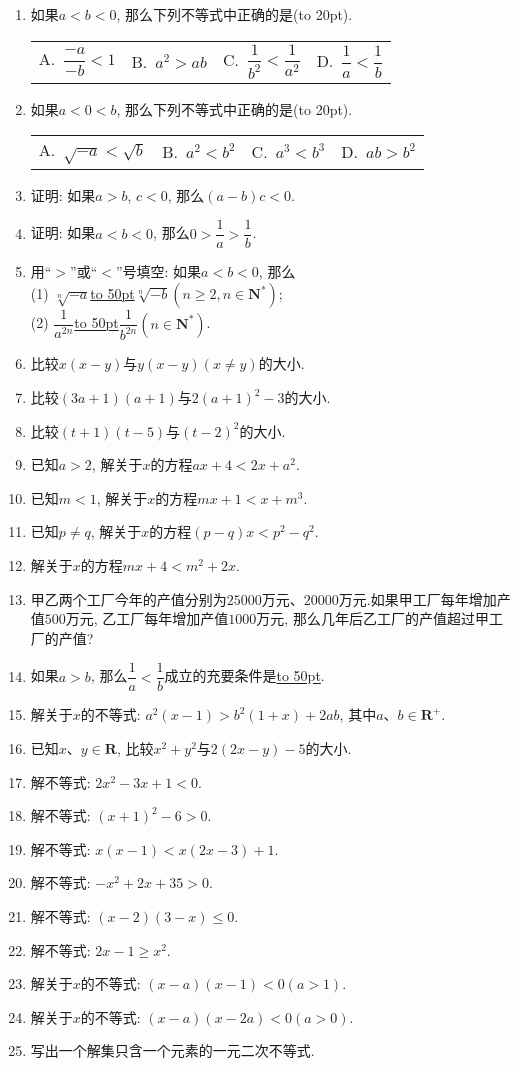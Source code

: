 \documentclass[10pt,a4paper]{article}
\newcommand{\blank}[1]{\underline{\hbox to #1pt{}}}
\newcommand{\bracket}[1]{(\hbox to #1pt{})}
\newcommand{\fourch}[4]{\par\begin{tabular}{p{.23\textwidth}p{.23\textwidth}p{.23\textwidth}p{.23\textwidth}}
A.~#1 &B.~#2& C.~#3& D.~#4
\end{tabular}}
\begin{document}
\begin{enumerate}[1.]
\item 如果$a<b<0$, 那么下列不等式中正确的是\bracket{20}.
\fourch{$\dfrac{-a}{-b}<1$}{$a^2>ab$}{$\dfrac 1{b^2}<\dfrac 1{a^2}$}{$\dfrac 1a<\dfrac 1b$}
\item 如果$a<0<b$, 那么下列不等式中正确的是\bracket{20}.
\fourch{$\sqrt {-a}<\sqrt b$}{$a^2<b^2$}{$a^3<b^3$}{$ab>b^2$}
\item 证明: 如果$a>b$, $c<0$, 那么$(a-b)c<0$.
\item 证明: 如果$a<b<0$, 那么$0>\dfrac 1a>\dfrac 1b$.
\item 用``$>$''或``$<$''号填空: 如果$a<b<0$, 那么\\
(1) $\sqrt [n]{-a}$\blank{50}$\sqrt [n]{-b}(n\ge 2,n\in \mathbf{N}^*)$;\\
(2) $\dfrac 1{a^{2n}}$\blank{50}$\dfrac 1{b^{2n}}(n\in \mathbf{N}^*)$.
\item 比较$x(x-y)$与$y(x-y)(x\ne y)$的大小.
\item 比较$(3a+1)(a+1)$与$2(a+1)^2-3$的大小.
\item 比较$(t+1)(t-5)$与$(t-2)^2$的大小.
\item 已知$a>2$, 解关于$x$的方程$ax+4<2x+a^2$.
\item 已知$m<1$, 解关于$x$的方程$mx+1<x+m^3$.
\item 已知$p\ne q$, 解关于$x$的方程$(p-q)x<p^2-q^2$.
\item 解关于$x$的方程$mx+4<m^2+2x$.
\item 甲乙两个工厂今年的产值分别为$25000$万元、$20000$万元.如果甲工厂每年增加产值$500$万元, 乙工厂每年增加产值$1000$万元, 那么几年后乙工厂的产值超过甲工厂的产值?
\item 如果$a>b$, 那么$\dfrac 1a<\dfrac 1b$成立的充要条件是\blank{50}.
\item 解关于$x$的不等式: $a^2(x-1)>b^2(1+x)+2ab$, 其中$a$、$b\in \mathbf{R}^+$.
\item 已知$x$、$y\in \mathbf{R}$, 比较$x^2+y^2$与$2(2x-y)-5$的大小.
\item 解不等式: $2x^2-3x+1<0$.
\item 解不等式: $(x+1)^2-6>0$.
\item 解不等式: $x(x-1)<x(2x-3)+1$.
\item 解不等式: $-x^2+2x+35>0$.
\item 解不等式: $(x-2)(3-x)\le 0$.
\item 解不等式: $2x-1\ge x^2$.
\item 解关于$x$的不等式: $(x-a)(x-1)<0(a>1)$.
\item 解关于$x$的不等式: $(x-a)(x-2a)<0(a>0)$.
\item 写出一个解集只含一个元素的一元二次不等式.

\end{enumerate}
\end{document}
